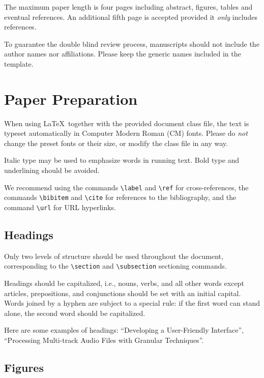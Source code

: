 \documentclass[runningheads,a4paper]{llncs}
\begin{document}
The maximum paper length is four pages including abstract, figures, tables
and eventual references. An additional fifth page is accepted provided it
\textit{only} includes references.

To guarantee the double blind review process, manuscripts should not include
the author names nor affiliations. Please keep the generic names included in the
template.

\section{Paper Preparation}

When using \LaTeX\ together with the provided document class file, the text
is typeset automatically in Computer Modern Roman (CM) fonts. Please do
\emph{not} change the preset fonts or their size, or modify the class file
in any way.

Italic type may be used to emphasize words in running text. Bold type and
underlining should be avoided.

We recommend using the commands \verb+\label+ and \verb+\ref+ for
cross-references, the commands \verb+\bibitem+ and \verb+\cite+ for
references to the bibliography, and the command \verb+\url+ for URL
hyperlinks.


\subsection{Headings}

Only two levels of structure should be used throughout the document,
corresponding to the \verb+\section+ and \verb+\subsection+ sectioning
commands.

Headings should be capitalized, i.e., nouns, verbs, and all other words
except articles, prepositions, and conjunctions should be set with an
initial capital. Words joined by a hyphen are subject to a special rule: if
the first word can stand alone, the second word should be capitalized.

Here are some examples of headings: ``Developing a User-Friendly
Interface'', ``Processing Multi-track Audio Files with Granular Techniques''.

\subsection{Figures}
\end{document}
